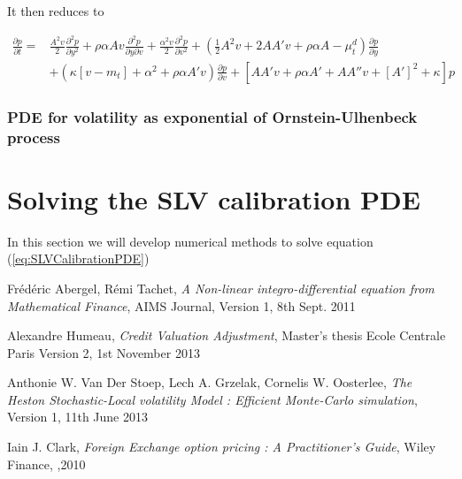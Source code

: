\documentclass{article}
\begin{document}
\noindent It then reduces to 

\begin{equation}
\begin{aligned}
	\frac{\partial p}{\partial t} =
 &\frac{A^2v}{2}\frac{\partial^2 p}{\partial y^2}
 + \rho \alpha A v \frac{\partial^2 p}{\partial y \partial v} 
+ \frac{\alpha^2 v}{2} \frac{\partial^2 p}{\partial v^2} 
+ \left(\frac{1}{2} A^2 v + 2 A A' v + \rho \alpha A - \mu^d_t\right)\frac{\partial p}{\partial y}\\
& + \left(\kappa \left[v - m_t\right] + \alpha^2 + \rho \alpha A' v\right) \frac{\partial p}{\partial v}
+\left[ AA'v + \rho \alpha A' + AA''v + \left[A'\right]^2 + \kappa\right] p
\end{aligned}
\end{equation}

\subsubsection{PDE for volatility as exponential of Ornstein-Ulhenbeck process}
\section{Solving the SLV calibration PDE}
In this section we will develop numerical methods to solve equation (\ref{eq:SLVCalibrationPDE})

\begin{thebibliography}{9}

  Frédéric Abergel, Rémi Tachet,
  \emph{A Non-linear integro-differential equation from Mathematical Finance},
  AIMS Journal,
  Version 1, 8th Sept. 2011

 Alexandre Humeau,
 \emph{Credit Valuation Adjustment},
 Master's thesis Ecole Centrale Paris
 Version 2, 
 1st November 2013

 Anthonie W. Van Der Stoep, Lech A. Grzelak, Cornelis W. Oosterlee,
 \emph{The Heston Stochastic-Local volatility Model : Efficient Monte-Carlo simulation},
 Version 1, 11th June 2013

 Iain J. Clark, 
 \emph{Foreign Exchange option pricing : A Practitioner's Guide},
 Wiley Finance,
 ,2010
\end{thebibliography}
\end{document}
